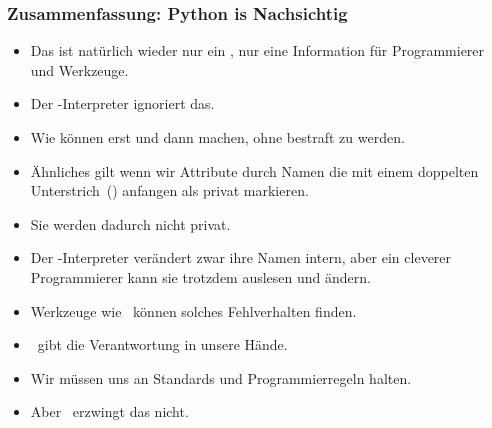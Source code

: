 \documentclass[aspectratio=169,mathserif,notheorems]{beamer}%
\begin{document}
%
\begin{frame}%
\frametitle{Zusammenfassung: Python is Nachsichtig}%
\begin{itemize}%
%
%
%
%
%
%
%
%
%
%
%
%
%
%
\item<8-> Das ist natürlich wieder nur ein , nur eine Information für Programmierer und Werkzeuge.%
%
\item<9-> Der \python-Interpreter ignoriert das.%
%
\item<10-> Wie können erst  und dann  machen, ohne bestraft zu werden.%
%
\item<11-> Ähnliches gilt wenn wir Attribute durch Namen die mit einem doppelten Unterstrich~(\pythonilIdx{\_\_}) anfangen als privat markieren.%
%
\item<12-> Sie werden dadurch nicht privat.%
%
\item<13-> Der \python-Interpreter verändert zwar ihre Namen intern, aber ein cleverer Programmierer kann sie trotzdem auslesen und ändern.%
%
\item<14-> Werkzeuge wie \mypy\ können solches Fehlverhalten finden.%
%
\item<15-> \python\ gibt die Verantwortung in unsere Hände.%
%
\item<16-> Wir müssen uns an Standards und Programmierregeln halten.%
%
\item<17-> Aber \python\ erzwingt das nicht.%
\end{itemize}%
\end{frame}%
%
\endPresentation%
\end{document}

